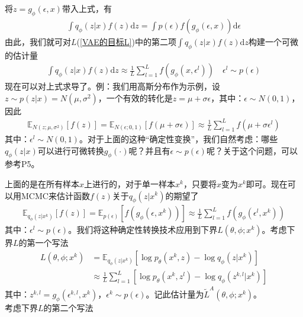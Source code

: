             将$z = g_\phi(\epsilon,x)$带入上式，有
            \begin{align*}
            \int q_\phi(z|x) f(z)\mathrm{d}z = \int p(\epsilon) f(g_\phi(\epsilon,x))\mathrm{d}\epsilon
            \end{align*}
            由此，我们就可对$L$(\ref{VAE的目标L})中的第二项$\int q_\phi(z|x)f(z)\mathrm{d}z$构建一个可微的估计量
            \begin{align*}
            \int q_\phi (z|x)f(z)\mathrm{d}z \approx \frac{1}{L}\sum_{l=1}^L f(g_\phi (x,\epsilon^l)) \quad \epsilon^l \sim p(\epsilon)
            \end{align*}
            现在可以对上式求导了。例：我们用高斯分布作为示例，设$z\sim p(z|x) = N(\mu,\sigma^2)$，一个有效的转化是$z = \mu + \sigma \epsilon$，其中：$\epsilon \sim N(0,1)$，因此
            \begin{align*}
            \mathbb{E} _{N(z;\mu,\sigma^2)}[f(z)] = \mathbb{E}_{N(\epsilon;0,1)}[f(\mu+\sigma \epsilon)] \approx \frac{1}{L} \sum_{l=1}^L f(\mu+\sigma \epsilon^l)
            \end{align*}
            其中：$\epsilon^l \sim N(0,1) $。对于上面的这种“确定性变换”，我们自然考虑：哪些$q_\phi(z|x)$可以进行可微转换$g_\phi(\cdot)$呢？并且有$\epsilon \sim p(\epsilon)$呢？关于这个问题，可以参考\cite{2014.Kingma}P5。
            \par
            上面的是在所有样本$x$上进行的，对于单一样本$x^k$，只要将$x$变为$x^k$即可。现在可以用MCMC来估计函数$f(z)$关于$q_\phi(z|x^k)$的期望了
            \begin{align*}
            \mathbb{E} _{q_\phi(z|x^k)}[f(z)] = \mathbb{E}_{p(\epsilon)}[f(g_\phi(\epsilon,x^k))] \approx \frac{1}{L} \sum_{l=1}^L f(g_\phi(\epsilon^l,x^k))
            \end{align*}
            其中：$\epsilon^l\sim p(\epsilon)$。我们将这种确定性转换技术应用到下界$L(\theta,\phi;x^k)$。考虑下界$L$的第一个写法
            \begin{align*}
            L(\theta,\phi;x^k)& = \mathbb{E}_{q_\phi(z|x^k)} \left[ \log p_\theta(x^k,z) - \log q_\phi(z|x^k) \right]\\
            & \approx \frac{1}{L} \sum_{l=1}^L \left[ \log p_\theta(x^k,z^l) - \log q_\phi (z^{k,l}|x^k) \right]
            \end{align*}
            其中：$z^{k,l} = g_\phi(\epsilon^{k,l},x^k)$，$\epsilon ^k \sim p(\epsilon)$。记此估计量为$\tilde{L}^A(\theta,\phi;x^k)$。\\
            考虑下界$L$的第二个写法
